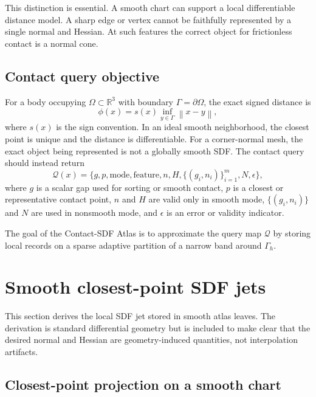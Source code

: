 \documentclass[preprint,12pt,sort&compress]{elsarticle}
\newcommand{\R}{\mathbb{R}}
\newcommand{\norm}[1]{\left\lVert #1 \right\rVert}
\newcommand{\cQ}{\mathcal{Q}}
\begin{document}
This distinction is essential. A smooth chart can support a local differentiable distance model. A sharp edge or vertex cannot be faithfully represented by a single normal and Hessian. At such features the correct object for frictionless contact is a normal cone.

\subsection{Contact query objective}

For a body occupying $\Omega\subset\R^3$ with boundary $\Gamma=\partial\Omega$, the exact signed distance is
\begin{equation}
 \phi(x) = s(x) \inf_{y\in\Gamma} \norm{x-y},
\label{eq:exact_sdf}
\end{equation}
where $s(x)$ is the sign convention. In an ideal smooth neighborhood, the closest point is unique and the distance is differentiable. For a corner-normal mesh, the exact object being represented is not a globally smooth SDF. The contact query should instead return
\begin{equation}
 \cQ(x)=\{g,p,\mathrm{mode},\mathrm{feature}, n, H, \{(g_i,n_i)\}_{i=1}^m, N, \epsilon\},
\label{eq:query_object}
\end{equation}
where $g$ is a scalar gap used for sorting or smooth contact, $p$ is a closest or representative contact point, $n$ and $H$ are valid only in smooth mode, $\{(g_i,n_i)\}$ and $N$ are used in nonsmooth mode, and $\epsilon$ is an error or validity indicator.

The goal of the Contact-SDF Atlas is to approximate the query map $\cQ$ by storing local records on a sparse adaptive partition of a narrow band around $\Gamma_h$.

\section{Smooth closest-point SDF jets}
\label{sec:smooth}

This section derives the local SDF jet stored in smooth atlas leaves. The derivation is standard differential geometry but is included to make clear that the desired normal and Hessian are geometry-induced quantities, not interpolation artifacts.

\subsection{Closest-point projection on a smooth chart}
\end{document}

